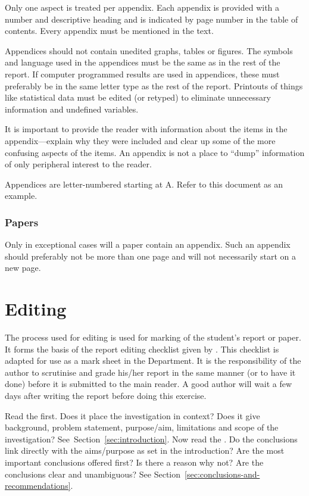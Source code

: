 \documentclass[a5paper, 10pt]{article}
\begin{document}
Only one aspect is treated per appendix.  Each appendix is provided
with a number and descriptive heading and is indicated by page number
in the table of contents.  Every appendix must be mentioned in the
text.

Appendices should not contain unedited graphs, tables or figures.  The
symbols and language used in the appendices must be the same as in the
rest of the report.  If computer programmed results are used in
appendices, these must preferably be in the same letter type as the
rest of the report.  Printouts of things like statistical data must be
edited (or retyped) to eliminate unnecessary information and undefined
variables.

It is important to provide the reader with information about the items
in the appendix---explain why they were included and clear up some of
the more confusing aspects of the items.  An appendix is not a place
to ``dump'' information of only peripheral interest to the reader.

Appendices are letter-numbered starting at A. Refer to this document as an example.

\subsubsection{Papers}
Only in exceptional cases will a paper contain an appendix.  Such an
appendix should preferably not be more than one page and will not
necessarily start on a new page.

\section{Editing}
\label{cha:editing}
The process used for editing is used for marking of the student's
report or paper.  It forms the basis of the report editing checklist
given by \citet[176]{bruckmanmandersloot}.  This checklist is adapted
for use as a mark sheet in the Department.  It is the responsibility
of the author to scrutinise and grade his/her report in the same
manner (or to have it done) before it is submitted to the main reader.
A good author will wait a few days after writing the report before
doing this exercise.

Read the  first.  Does it place the
investigation in context? Does it give background, problem
statement, purpose/aim, limitations and scope of the investigation?
See~Section~\ref{sec:introduction}.  Now read the
.  Do the conclusions link directly with the
aims/purpose as set in the introduction?  Are the most important
conclusions offered first?  Is there a reason why not?  Are the
conclusions clear and unambiguous?  See
Section~\ref{sec:conclusions-and-recommendations}.
\end{document}
